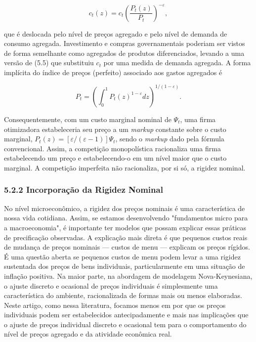 \documentclass[12pt]{article}
\begin{document}
\begin{equation}
c_t(z) = c_t \left( \frac{P_t(z)}{P_t} \right)^{-\varepsilon}, \tag{5.5}
\end{equation}

que é deslocada pelo nível de preços agregado e pelo nível de demanda de consumo agregada. Investimento e compras governamentais poderiam ser vistos de forma semelhante como agregados de produtos diferenciados, levando a uma versão de (5.5) que substituiu $c_t$ por uma medida de demanda agregada. A forma implícita do índice de preços (perfeito) associado aos gastos agregados é

\begin{equation}
P_t = \left( \int_0^1 P_t(z)^{1-\varepsilon} dz \right)^{1/(1-\varepsilon)}. \tag{5.6}
\end{equation}

Consequentemente, com um custo marginal nominal de $\Psi_t$, uma firma otimizadora estabeleceria seu preço a um \textit{markup} constante sobre o custo marginal, $P_t(z) = [\varepsilon/(\varepsilon-1)] \Psi_t$, sendo o \textit{markup} dado pela fórmula convencional. Assim, a competição monopolística racionaliza uma firma estabelecendo um preço e estabelecendo-o em um nível maior que o custo marginal. A competição imperfeita não racionaliza, por si só, a rigidez nominal.

\subsubsection{5.2.2 Incorporação da Rigidez Nominal} No nível microeconômico, a rigidez dos preços nominais é uma característica de nossa vida cotidiana. Assim, se estamos desenvolvendo "fundamentos micro para a macroeconomia", é importante ter modelos que possam explicar essas práticas de precificação observadas. A explicação mais direta é que pequenos custos reais de mudança de preços nominais — custos de menu — explicam os preços rígidos. É uma questão aberta se pequenos custos de menu podem levar a uma rigidez sustentada dos preços de bens individuais, particularmente em uma situação de inflação positiva. Na maior parte, na abordagem de modelagem Nova-Keynesiana, o ajuste discreto e ocasional de preços individuais é simplesmente uma característica do ambiente, racionalizada de formas mais ou menos elaboradas. Neste artigo, como nessa literatura, focamos menos em por que os preços individuais podem ser estabelecidos antecipadamente e mais nas implicações que o ajuste de preços individual discreto e ocasional tem para o comportamento do nível de preços agregado e da atividade econômica real.
\end{document}
